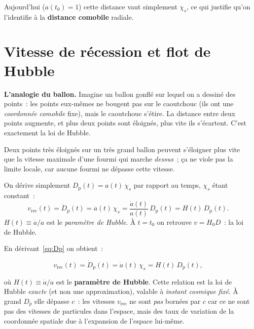 \documentclass[11pt,a4paper,openany]{report}
\newcommand{\Hzero}{H_{0}}
\begin{document}
\noindent Aujourd'hui ($a(t_0)=1$) cette distance vaut simplement $\chi_s$,
ce qui justifie qu'on l'identifie à la \textbf{distance comobile} radiale.

\section{Vitesse de récession et flot de Hubble}

\begin{tcolorbox}[vulgarisation]
\textbf{L'analogie du ballon.} Imagine un ballon gonflé sur lequel on a
dessiné des points~: les points eux-mêmes ne bougent pas sur le caoutchouc
(ils ont une \emph{coordonnée comobile} fixe), mais le caoutchouc s'étire.
La distance entre deux points augmente, et plus deux points sont éloignés,
plus vite ils s'écartent. C'est exactement la loi de Hubble.

\medskip
Deux points très éloignés sur un très grand ballon peuvent s'éloigner plus
vite que la vitesse maximale d'une fourmi qui marche \emph{dessus}~; ça ne
viole pas la limite locale, car aucune fourmi ne dépasse cette vitesse.
\end{tcolorbox}

\begin{tcolorbox}[mathspe]
On dérive simplement $D_{\text{p}}(t) = a(t)\,\chi_s$ par rapport au temps,
$\chi_s$ étant constant~:
\[
v_{\text{rec}}(t) = \dot D_{\text{p}}(t) = \dot a(t)\,\chi_s
                  = \frac{\dot a(t)}{a(t)}\,D_{\text{p}}(t)
                  = H(t)\,D_{\text{p}}(t).
\]
$H(t) \equiv \dot a/a$ est le \emph{paramètre de Hubble}. À $t=t_0$ on retrouve
$v = \Hzero D$~: la loi de Hubble.
\end{tcolorbox}

En dérivant~\eqref{eq:Dp} on obtient~:

\begin{equation}
v_{\text{rec}}(t) = \dot D_{\text{p}}(t) = \dot a(t)\,\chi_s
                  = H(t)\,D_{\text{p}}(t),
\label{eq:Hubble_flow}
\end{equation}

\noindent où $H(t) \equiv \dot a/a$ est le \textbf{paramètre de Hubble}. Cette
relation est la loi de Hubble \emph{exacte} (et non une approximation), valable
à \emph{instant cosmique fixé}. À grand $D_p$ elle dépasse $c$~: les vitesses
$v_{\text{rec}}$ ne sont \emph{pas} bornées par $c$ car ce ne sont pas des
vitesses de particules dans l'espace, mais des taux de variation de la coordonnée
spatiale due à l'expansion de l'espace lui-même.
\end{document}
